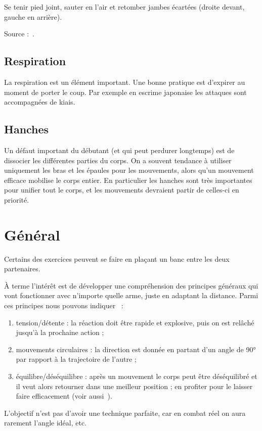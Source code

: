 \begin{exercice}

Se tenir pied joint, sauter en l'air et retomber jambes écartées (droite devant, gauche en arrière).

Source :~\cite{enzi:dijon:messer_inner:2015}.

\end{exercice}


\subsection{Respiration}

La respiration est un élément important.
Une bonne pratique est d'expirer au moment de porter le coup.
Par exemple en escrime japonaise les attaques sont accompagnées de kiais.


\subsection{Hanches}

Un défaut important du débutant (et qui peut perdurer longtemps) est de dissocier les différentes parties du corps.
On a souvent tendance à utiliser uniquement les bras et les épaules pour les mouvements, alors qu'un mouvement efficace mobilise le corps entier.
En particulier les hanches sont très importantes pour unifier tout le corps, et les mouvements devraient partir de celles-ci en priorité.


\section{Général}
\label{sec:structure:général}


Certains des exercices peuvent se faire en plaçant un banc entre les deux partenaires.

À terme l'intérêt est de développer une compréhension des principes généraux qui vont fonctionner avec n'importe quelle arme, juste en adaptant la distance.
Parmi ces principes nous pouvons indiquer~\cite{enzi:dijon:messer_inner:2015} :
\begin{enumerate}
	\item tension/détente : la réaction doit être rapide et explosive, puis on est relâché jusqu'à la prochaine action ;
	\item mouvements circulaires : la direction est donnée en partant d'un angle de 90° par rapport à la trajectoire de l'autre ;
	\item équilibre/déséquilibre : après un mouvement le corps peut être déséquilibré et il veut alors retourner dans une meilleur position ; en profiter pour le laisser faire efficacement (voir aussi~\cite{guidoux:dijon:thibault:2015}).
\end{enumerate}
L'objectif n'est pas d'avoir une technique parfaite, car en combat réel on aura rarement l'angle idéal, etc.


